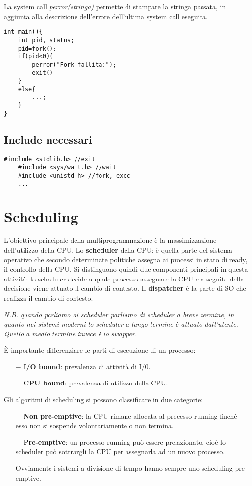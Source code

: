 \documentclass{article}
\begin{document}
\noindent La system call \textit{perror(stringa)} permette di
 stampare la stringa passata, in aggiunta alla descrizione 
 dell'errore dell'ultima system call eseguita.

\begin{lstlisting}[style=CStyle]
int main(){
    int pid, status;
    pid=fork();
    if(pid<0){
        perror("Fork fallita:");
        exit()
    }
    else{
        ...;
    }
}
\end{lstlisting}

\subsection{Include necessari}
\begin{lstlisting}[style=CStyle]
    #include <stdlib.h> //exit
    #include <sys/wait.h> //wait
    #include <unistd.h> //fork, exec
    ...
\end{lstlisting}

\section{Scheduling}
L'obiettivo principale della multiprogrammazione è la massimizzazione 
dell'utilizzo della CPU.
Lo \textbf{scheduler} della CPU: è quella parte del sistema operativo 
che secondo determinate politiche assegna ai processi in stato 
di ready, il controllo della CPU.
Si distinguono quindi due componenti principali in questa 
attività: lo scheduler decide a quale processo assegnare
la CPU e a seguito della decisione viene attuato il cambio di
contesto. Il \textbf{dispatcher} è la parte di SO che
realizza il cambio di contesto.
\medskip

\noindent \textit{N.B. quando parliamo di scheduler parliamo
 di scheduler a breve termine, in quanto nei sistemi moderni
 lo scheduler a lungo termine è attuato dall'utente. Quello
 a medio termine invece è lo swapper.
}
\medskip

\noindent È importante differenziare le parti di esecuzione
 di un processo:\begin{itemize}
    \item[$-$] \textbf{I/O bound}: prevalenza di attività di I/0.
    \item[$-$] \textbf{CPU bound}: prevalenza di utilizzo della CPU.
  \end{itemize}
\noindent Gli algoritmi di scheduling si possono classificare in due categorie:
\begin{itemize}
    \item[$-$] \textbf{Non pre-emptive}: la CPU rimane allocata al
    processo running finché esso non si sospende volontariamente
    o non termina.

    \item[$-$] \textbf{Pre-emptive}: un processo running può essere
    prelazionato, cioè lo scheduler può sottrargli la CPU per 
    assegnarla ad un nuovo processo.

    Ovviamente i sistemi a divisione di tempo hanno sempre 
    uno scheduling pre-emptive.
 \end{itemize}
\end{document}
